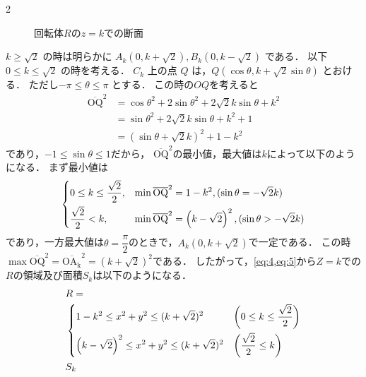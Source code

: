 \documentclass[../../main.tex]{subfiles}
\begin{document}
\begin{multicols}{2}
\begin{figure}[H]
\begin{tikzpicture}[scale=0.8]
    \end{tikzpicture}
    \caption{回転体$R$の$z=k$での断面}
    \label{1998-2:fig:3}
  \end{figure}

  $k \ge \sqrt{2}$ の時は明らかに $A_k(0, k+\sqrt{2}), B_k(0, k-\sqrt{2})$ である．
  以下 $0 \le k \le \sqrt{2}$ の時を考える．
  $C_k$ 上の点 $Q$ は，$Q(\cos\theta, k+\sqrt{2}\sin\theta)$ とおける．
  ただし$-\pi \le \theta \le \pi$ とする．
  この時の$OQ$を考えると
  \begin{align}
    \overline{\text{OQ}}^2
    & = \cos\theta^2+2\sin\theta^2+2\sqrt{2}k\sin\theta+k^2 \\
    & = \sin\theta^2+2\sqrt{2}k\sin\theta+k^2+1            \\
    & = (\sin\theta+\sqrt{2}k)^2+1-k^2
  \end{align}
  であり，$-1 \le \sin\theta \le 1$だから，
  $\overline{\text{OQ}}^2$の最小値，最大値は$k$によって以下のようになる．
  まず最小値は
  \begin{align}\label{eq:5}
    \begin{dcases}
      0 \le k \le \dfrac{\sqrt{2}}{2}, & \min \overline{\text{OQ}}^2 = 1-k^2, (\sin\theta=-\sqrt{2}k)                     \\
      \dfrac{\sqrt{2}}{2} < k,   & \min \overline{\text{OQ}}^2 = \left(k-\sqrt{2}\right)^2, (\sin\theta>-\sqrt{2}k)
    \end{dcases}
  \end{align}
  であり，一方最大値は$\theta=\dfrac{\pi}{2}$のときで，$A_k(0, k+\sqrt{2})$で一定である．
  この時$\max \overline{\text{OQ}}^2 = \overline{\mathrm{OA_k}}^2 = (k+\sqrt{2})^2$である．
  したがって，\cref{eq:4,eq:5}から$Z=k$での$R$の領域及び面積$S_k$は以下のようになる．
  \begin{align}
    & R =      \nonumber                                                                                                                       \\
    &
    \begin{dcases}
      1-k^2 \le x^2+y^2 \le (k+\sqrt{2})^2                        & \left(0 \le k \le \dfrac{\sqrt{2}}{2}\right) \\
      \left(k-\sqrt{2}\right)^2 \le x^2+y^2 \le (k+\sqrt{2})^2 & \left(\dfrac{\sqrt{2}}{2} \le k \right)
    \end{dcases} \label{eq:6} \\
    & S_k               \nonumber                                                                                                              \\

\end{align}
\end{multicols}
\end{document}
